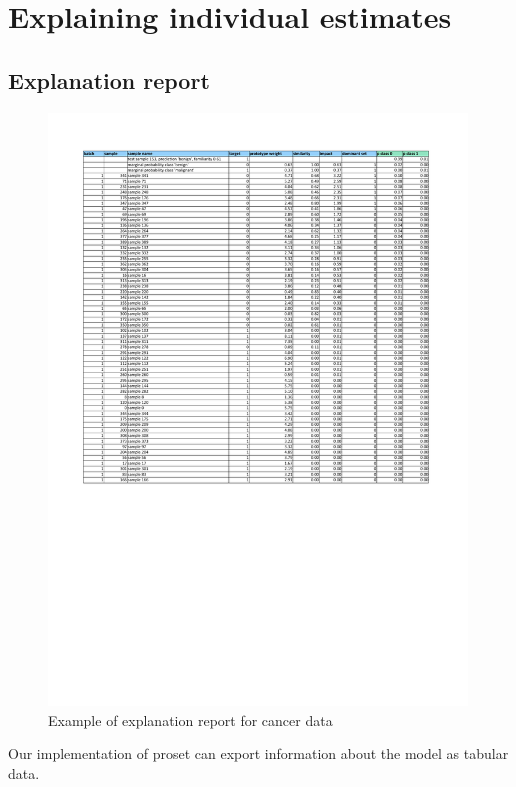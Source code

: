 \section{Explaining individual estimates}
\label{sec_individual_explanations}
%
\subsection{Explanation report}
\label{sec_explanation_report}
%
\begin{figure}
\caption{Example of explanation report for cancer data}
\label{fig_explanation_report}
%
\begin{center}
\includegraphics[width=0.99\textwidth]{figures/cancer_2d_95_model_explain.pdf}
\end{center}
\end{figure}
%
Our implementation of proset can export information about the model as tabular data.

